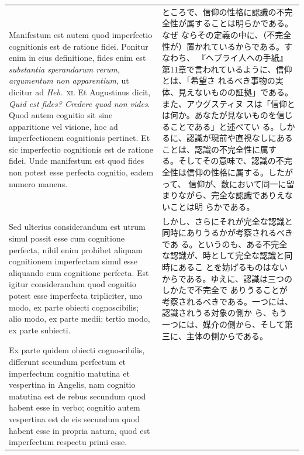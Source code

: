 \documentclass[paper=a4paper,fontsize=10pt,jafontsize=9pt,titlepage]{jlreq}
\begin{document}
\begin{longtable}{p{21em}p{21em}}
\\

 Manifestum est autem quod imperfectio cognitionis est de ratione
 fidei. Ponitur enim in eius definitione, fides enim est {\itshape
 substantia sperandarum rerum, argumentum non apparentium}, ut dicitur
 ad {\itshape Heb}.~{\scshape xi}. Et Augustinus dicit, {\itshape Quid est fides?
 Credere quod non vides}. Quod autem cognitio sit sine apparitione vel
 visione, hoc ad imperfectionem cognitionis pertinet. Et sic
 imperfectio cognitionis est de ratione fidei. Unde manifestum est
 quod fides non potest esse perfecta cognitio, eadem numero manens.
 
&


 ところで、信仰の性格に認識の不完全性が属することは明らかである。なぜ
 ならその定義の中に、（不完全性が）置かれているからである。すなわち、
 『ヘブライ人への手紙』第11章で言われているように、信仰とは、「希望さ
 れるべき事物の実体、見えないものの証拠」である。また、アウグスティヌ
 スは「信仰とは何か。あなたが見ないものを信じることである」と述べてい
 る。しかるに、認識が現前や直視なしにあることは、認識の不完全性に属す
 る。そしてその意味で、認識の不完全性は信仰の性格に属する。したがって、
 信仰が、数において同一に留まりながら、完全な認識でありえないことは明
 らかである。
 

\\


 Sed ulterius considerandum est utrum simul possit esse cum cognitione
 perfecta, nihil enim prohibet aliquam cognitionem imperfectam simul
 esse aliquando cum cognitione perfecta. Est igitur considerandum quod
 cognitio potest esse imperfecta tripliciter, uno modo, ex parte
 obiecti cognoscibilis; alio modo, ex parte medii; tertio modo, ex
 parte subiecti.
 
&

 しかし、さらにそれが完全な認識と同時にありうるかが考察されるべきであ
 る。というのも、ある不完全な認識が、時として完全な認識と同時にあるこ
 とを妨げるものはないからである。ゆえに、認識は三つのしかたで不完全で
 ありうることが考察されるべきである。一つには、認識されうる対象の側か
 ら、もう一つには、媒介の側から、そして第三に、主体の側からである。

\\

 Ex parte quidem obiecti cognoscibilis, differunt secundum perfectum
 et imperfectum cognitio matutina et vespertina in Angelis, nam
 cognitio matutina est de rebus secundum quod habent esse in verbo;
 cognitio autem vespertina est de eis secundum quod habent esse in
 propria natura, quod est imperfectum respectu primi esse.


\end{longtable}
\end{document}
